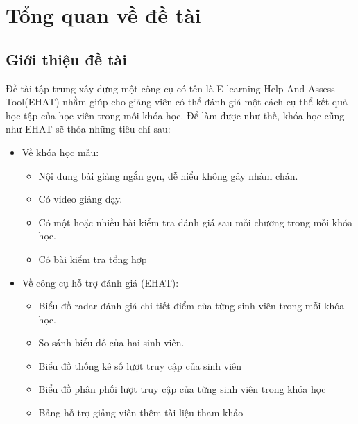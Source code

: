\fontsize{13}{5}\selectfont
\setcounter{chapter}{0}
\chapter{Tổng quan về đề tài}
\section{Giới thiệu đề tài}
Đề tài tập trung xây dựng một công cụ có tên là E-learning Help And Assess Tool(EHAT) nhằm giúp cho giảng viên có thể đánh giá một cách cụ thể kết quả học tập của học viên trong mỗi khóa học. Để làm được như thế, khóa học cũng như EHAT sẽ thỏa những tiêu chí sau:
\begin{itemize}
	\item Về khóa học mẫu:
	\begin{itemize}
		\item Nội dung bài giảng ngắn gọn, dễ hiểu không gây nhàm chán.
		\item Có video giảng dạy.
		\item Có một hoặc nhiều bài kiểm tra đánh giá sau mỗi chương trong mỗi khóa học.
		\item Có bài kiểm tra tổng hợp
	\end{itemize}
	\item Về công cụ hỗ trợ đánh giá (EHAT):
	\begin{itemize}
		\item Biểu đồ radar đánh giá chi tiết điểm của từng sinh viên trong mỗi khóa học.
		\item So sánh biểu đồ của hai sinh viên.
		\item Biểu đồ thống kê số lượt truy cập của sinh viên
		\item Biểu đồ phân phối lượt truy cập của từng sinh viên trong khóa học
		\item Bảng hỗ trợ giảng viên thêm tài liệu tham khảo
	\end{itemize}
\end{itemize}

